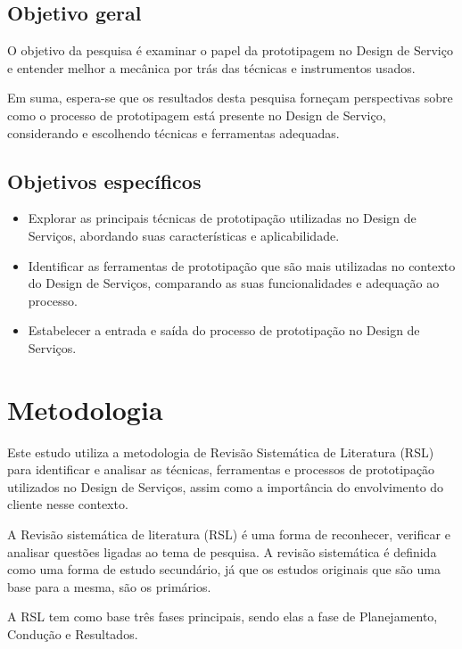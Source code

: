 \subsection{Objetivo geral}

O objetivo da pesquisa é examinar o papel da prototipagem no Design de Serviço e entender melhor a mecânica por trás das técnicas e instrumentos usados.

Em suma, espera-se que os resultados desta pesquisa forneçam perspectivas sobre como o processo de prototipagem está presente no Design de Serviço, considerando e escolhendo técnicas e ferramentas adequadas.

\subsection{Objetivos específicos}

\begin{itemize}
	\item Explorar as principais técnicas de prototipação utilizadas no Design de Serviços, abordando suas características e aplicabilidade.
	
	\item Identificar as ferramentas de prototipação que são mais utilizadas no contexto do Design de Serviços, comparando as suas funcionalidades e adequação ao processo.
	
	\item Estabelecer a entrada e saída do processo de prototipação no Design de Serviços.%
\end{itemize}

\section{Metodologia}

Este estudo utiliza a metodologia de Revisão Sistemática de Literatura (RSL) para identificar e analisar as técnicas, ferramentas e processos de prototipação utilizados no Design de Serviços, assim como a importância do envolvimento do cliente nesse contexto. 

A Revisão sistemática de literatura (RSL) é uma forma de reconhecer, verificar e analisar questões ligadas ao tema de pesquisa. A revisão sistemática é definida como uma forma de estudo secundário, já que os estudos originais que são uma base para a mesma, são os primários.

A RSL tem como base três fases principais, sendo elas a fase de Planejamento, Condução e Resultados.

